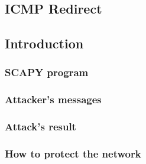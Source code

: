 \subsection{ICMP Redirect}
\subsection{Introduction}


\subsubsection{SCAPY program}


\subsubsection{Attacker's messages}

\subsubsection{Attack's result}


\subsubsection{How to protect the network}
